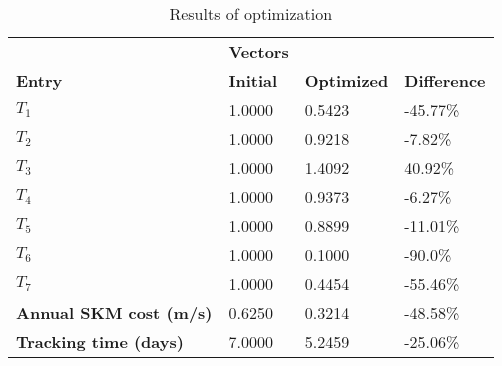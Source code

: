 \begin{table}[H]
\centering
\begin{tabular}{llll}
\textbf{}      & \cellcolor[HTML]{EFEFEF}\textbf{Vectors} & \textbf{} & \textbf{}         \\
\rowcolor[HTML]{EFEFEF} 
\textbf{Entry} & \textbf{Initial} & \textbf{Optimized} & \textbf{Difference} \\
$T_1$ & 1.0000 & 0.5423 & -45.77\% \\ 
$T_2$ & 1.0000 & 0.9218 & -7.82\% \\ 
$T_3$ & 1.0000 & 1.4092 & 40.92\% \\ 
$T_4$ & 1.0000 & 0.9373 & -6.27\% \\ 
$T_5$ & 1.0000 & 0.8899 & -11.01\% \\ 
$T_6$ & 1.0000 & 0.1000 & -90.0\% \\ 
$T_7$ & 1.0000 & 0.4454 & -55.46\% \\ 
\rowcolor[HTML]{EFEFEF} 
\textbf{Annual SKM cost (m/s)}  & 0.6250 & 0.3214 & -48.58\% \\ 
\rowcolor[HTML]{EFEFEF} 
\textbf{Tracking time (days)}  & 7.0000 & 5.2459 & -25.06\% \\ 
\end{tabular}
\caption{Results of optimization}
\label{tab:OptimizationAnalysis}
\end{table}